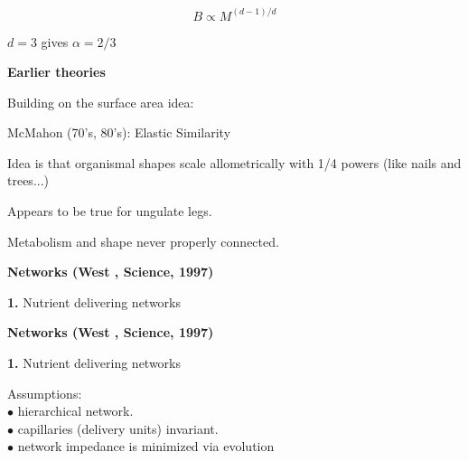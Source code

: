 {

$$B \propto M^{(d-1)/d}$$


$d=3$ gives $\alpha = 2/3$


\inv

\vis



  \textbf{Earlier theories}

Building on the surface area idea:

McMahon (70's, 80's): Elastic Similarity

 Idea is that organismal shapes scale allometrically
with 1/4 powers {\small (like nails and trees...)}

 Appears to be true for ungulate legs.

 Metabolism and shape never properly connected.


  \textbf{Networks {\tiny (West \etal, Science, 1997)}}

  \textbf{1.} Nutrient delivering networks 


  \inv


  \vis


  \textbf{Networks {\tiny (West \etal, Science, 1997)}}

  \textbf{1.} Nutrient delivering networks 

  Assumptions:\\
  $\bullet$ hierarchical network.\\
  $\bullet$ capillaries (delivery units) invariant.\\
  $\bullet$ network impedance is minimized via evolution






}
